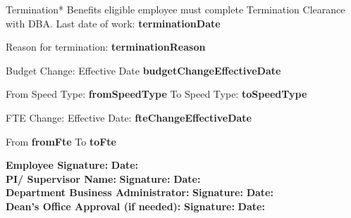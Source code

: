 \documentclass{article}
\begin{document}
\vspace{-0.2cm}
\noindent
\begin{minipage}{0.50\textwidth}
    \begin{tcolorbox}[standard jigsaw, opacityback=0, width=\textwidth]
        \begin{Form}
            \vspace{-0.1cm}
            \CheckBox[name=action1, checked=false]{} Termination* \tiny Benefits eligible employee must complete
                    Termination Clearance with DBA.
            \normalsize
            Last date of work: \textbf{ {{terminationDate}} }\vspace{0.2cm}

            Reason for termination: \textbf{ {{terminationReason}} }\vspace{0.3cm}

            \CheckBox[name=action2, checked=false]{} Budget Change:\hspace{0.2cm} Effective Date \textbf{ {{budgetChangeEffectiveDate}} }\vspace{0.2cm}

            From Speed Type: \textbf{ {{fromSpeedType}} } To Speed Type: \textbf{ {{toSpeedType}} }\vspace{0.3cm}

            \CheckBox[name=action3, checked=false]{} FTE Change:\hspace{0.2cm} Effective Date: \textbf{ {{fteChangeEffectiveDate}} }\vspace{0.2cm}

            From \textbf{ {{fromFte}} } \hspace{0.1cm} To \textbf{ {{toFte}} } 
        \end{Form}
    \end{tcolorbox}
\end{minipage}
\vspace{0.4cm}
\begin{tcolorbox}[standard jigsaw, opacityback=0]
    \begin{Form}
        \textbf{Employee Signature:} \hfill \textbf{Date:} \\
        \textbf{PI/ Supervisor Name:} \hfill \textbf{Signature:} \hfill \textbf{Date:}\\
        \textbf{Department Business Administrator:}  \hfill \textbf{Signature:} \hfill \textbf{Date:} \\
        \textbf{Dean's Office Approval (if needed):} \hfill \textbf{Signature:} \hfill \textbf{Date:}
    \end{Form}
\end{tcolorbox}
\end{document}
